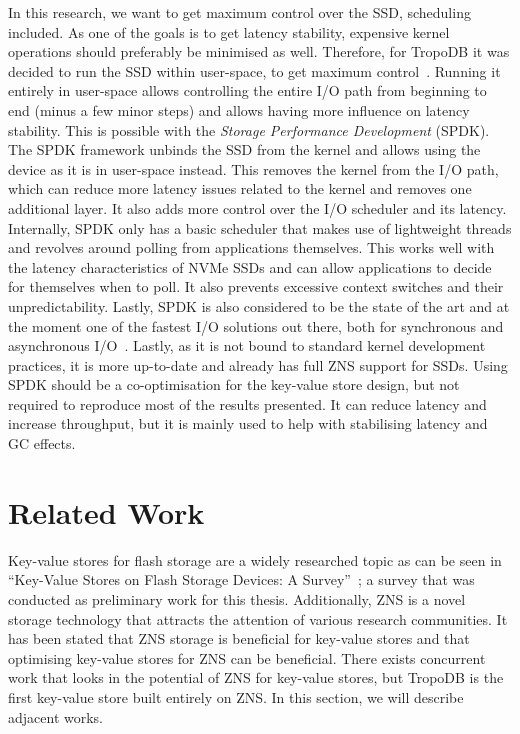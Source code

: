 In this research, we want to get maximum control over the SSD, scheduling included. As one of the goals is to get latency stability, expensive kernel operations should preferably be minimised as well. Therefore, for TropoDB it was decided to run the SSD within user-space, to get maximum control~\cite{yang2017spdk}. Running it entirely in user-space allows controlling the entire I/O path from beginning to end (minus a few minor steps) and allows having more influence on latency stability. This is possible with the \textit{Storage Performance Development} (SPDK). The SPDK framework unbinds the SSD from the kernel and allows using the device as it is in user-space instead. This removes the kernel from the I/O path, which can reduce more latency issues related to the kernel and removes one additional layer. It also adds more control over the I/O scheduler and its latency. Internally, SPDK only has a basic scheduler that makes use of lightweight threads and revolves around polling from applications themselves. This works well with the latency characteristics of NVMe SSDs and can allow applications to decide for themselves when to poll. It also prevents excessive context switches and their unpredictability. Lastly, SPDK is also considered to be the state of the art and at the moment one of the fastest I/O solutions out there, both for synchronous and asynchronous I/O~\cite{didona2022understanding, kourtis2019reaping}. Lastly, as it is not bound to standard kernel development practices, it is more up-to-date and already has full ZNS support for SSDs. Using SPDK should be a co-optimisation for the key-value store design, but not required to reproduce most of the results presented. It can reduce latency and increase throughput, but it is mainly used to help with stabilising latency and GC effects.

\section{Related Work}
\label{sec:novelty}
Key-value stores for flash storage are a widely researched topic as can be seen in ``Key-Value Stores on Flash Storage Devices: A Survey''~\cite{doekemeijer2022key}; a survey that was conducted as preliminary work for this thesis. Additionally, ZNS is a novel storage technology that attracts the attention of various research communities. It has been stated that ZNS storage is beneficial for key-value stores and that optimising key-value stores for ZNS can be beneficial. There exists concurrent work that looks in the potential of ZNS for key-value stores, but TropoDB is the first key-value store built entirely on ZNS. In this section, we will describe adjacent works.

